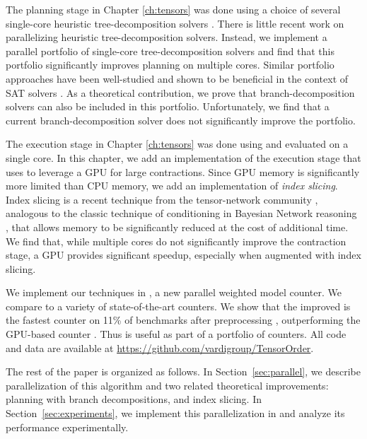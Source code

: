 The planning stage in Chapter \ref{ch:tensors} was done using a choice of several single-core heuristic tree-decomposition solvers \cite{AMW17,HS18,Tamaki17}. There is little recent work on parallelizing heuristic tree-decomposition solvers. Instead, we implement a parallel portfolio of single-core tree-decomposition solvers and find that this portfolio significantly improves planning on multiple cores. Similar portfolio approaches have been well-studied and shown to be beneficial in the context of SAT solvers \cite{BSS15,XHHL08}. As a theoretical contribution, we prove that branch-decomposition solvers can also be included in this portfolio. Unfortunately, we find that a current branch-decomposition solver does not significantly improve the portfolio.

The execution stage in Chapter \ref{ch:tensors} was done using  \cite{numpy} and evaluated on a single core. In this chapter, we add an implementation of the execution stage that uses  \cite{ABCCDDDGII16} to leverage a GPU for large contractions. Since GPU memory is significantly more limited than CPU memory, we add an implementation of \emph{index slicing}. Index slicing is a recent technique from the tensor-network community \cite{CZHNS18,GK20,VBNHRBM19}, analogous to the classic technique of conditioning in Bayesian Network reasoning \cite{darwiche01,dechter99,pearl86,SAS94}, that allows memory to be significantly reduced at the cost of additional time. We find that, while multiple cores do not significantly improve the contraction stage, a GPU provides significant speedup, especially when augmented with index slicing.

We implement our techniques in , a new parallel weighted model counter. We compare  to a variety of state-of-the-art counters. We show that the improved  is the fastest counter on 11\% of benchmarks after preprocessing \cite{LM14}, outperforming the GPU-based counter  \cite{FHZ19}. Thus  is useful as part of a portfolio of counters. All code and data are available at  \url{https://github.com/vardigroup/TensorOrder}.

The rest of the paper is organized as follows. 
In Section~\ref{sec:parallel}, we describe parallelization of this algorithm and two related theoretical improvements: planning with branch decompositions, and index slicing. 
In Section~\ref{sec:experiments}, we implement this parallelization in  and analyze its performance experimentally.

